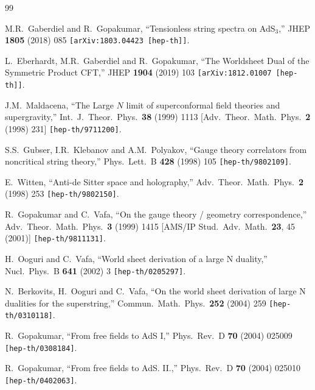 \documentclass[12pt,a4paper]{article}
\begin{document}
\begin{thebibliography}{99}

M.R.~Gaberdiel and R.~Gopakumar,
``Tensionless string spectra on AdS$_{3}$,''
JHEP {\bf 1805} (2018) 085
{\tt [arXiv:1803.04423 [hep-th]]}.

L.~Eberhardt, M.R.~Gaberdiel and R.~Gopakumar,
``The Worldsheet Dual of the Symmetric Product CFT,''
JHEP {\bf 1904} (2019) 103
{\tt [arXiv:1812.01007 [hep-th]]}.

J.M.~Maldacena,
``The Large $N$ limit of superconformal field theories and supergravity,''
Int.\ J.\ Theor.\ Phys.\  {\bf 38} (1999) 1113
[Adv.\ Theor.\ Math.\ Phys.\  {\bf 2} (1998) 231]
{\tt [hep-th/9711200]}.

S.S.~Gubser, I.R.~Klebanov and A.M.~Polyakov,
``Gauge theory correlators from noncritical string theory,''
Phys.\ Lett.\ B {\bf 428} (1998) 105 
{\tt [hep-th/9802109]}.
  
E.~Witten,
``Anti-de Sitter space and holography,''
Adv.\ Theor.\ Math.\ Phys.\  {\bf 2} (1998) 253 
{\tt [hep-th/9802150]}.
  
R.~Gopakumar and C.~Vafa,
``On the gauge theory / geometry correspondence,''
Adv.\ Theor.\ Math.\ Phys.\  {\bf 3} (1999) 1415 
[AMS/IP Stud.\ Adv.\ Math.\  {\bf 23}, 45 (2001)]
{\tt [hep-th/9811131]}. 

H.~Ooguri and C.~Vafa,
``World sheet derivation of a large N duality,''
Nucl.\ Phys.\ B {\bf 641} (2002) 3 
{\tt [hep-th/0205297]}.
  
N.~Berkovits, H.~Ooguri and C.~Vafa,
``On the world sheet derivation of large N dualities for the superstring,''
Commun.\ Math.\ Phys.\  {\bf 252} (2004) 259 
{\tt [hep-th/0310118]}. 
 
R.~Gopakumar,
``From free fields to AdS I,''
Phys.\ Rev.\ D {\bf 70} (2004) 025009 
{\tt  [hep-th/0308184]}.
  
R.~Gopakumar,
``From free fields to AdS. II.,''
Phys.\ Rev.\ D {\bf 70} (2004) 025010 
{\tt  [hep-th/0402063]}. 
 

\end{thebibliography}
\end{document}

